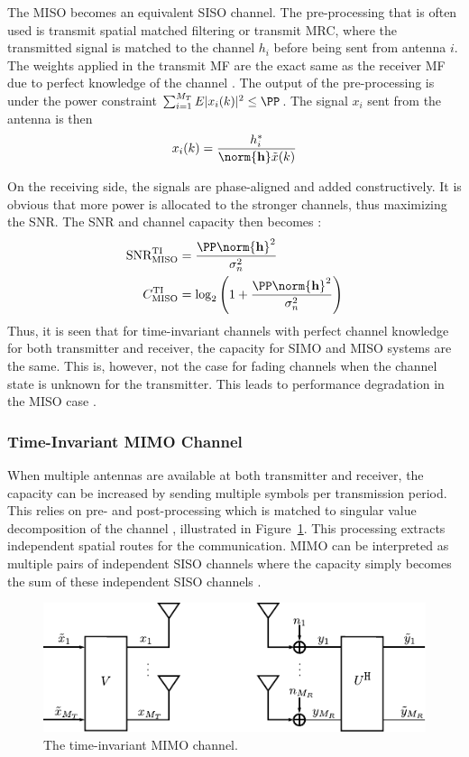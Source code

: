 The MISO becomes an equivalent SISO channel. The pre-processing that is often used is transmit spatial matched filtering or transmit MRC, where the transmitted signal is matched to the channel $h_i$ before being sent from antenna $i$. The weights applied in the transmit MF are the exact same as the receiver MF due to perfect knowledge of the channel \cite{Tim2012Practical}. The output of the pre-processing is under the power constraint $\sum_{i=1}^{M_T} E|x_i(k)|^2 \leq \PP$. The signal $x_i$ sent from the antenna is then \cite{Tim2012Practical}
\begin{align}%
  x_i(k) = \frac{h_i^*}{\norm{\mathbf{h}} \tilde{x}(k)}
\end{align}

On the receiving side, the signals are phase-aligned and added constructively. It is obvious that more power is allocated to the stronger channels, thus maximizing the SNR. The SNR and channel capacity then becomes \cite{Tim2012Practical}:
\begin{align} %
\text{SNR}^{\text{TI}}_{\text{MISO}} &= \frac{\PP \norm{\mathbf{h}}^2}{\sigma^2_n} \\
C^{\text{TI}}_{\text{MISO}} &= \log_2 \left( 1+\frac{\PP \norm{\mathbf{h}}^2}{\sigma^2_n} \right)  
\end{align}
Thus, it is seen that for time-invariant channels with perfect channel knowledge for both transmitter and receiver, the capacity for SIMO and MISO systems are the same. This is, however, not the case for fading channels when the channel state is unknown for the transmitter. This leads to performance degradation in the MISO case \cite{Tim2012Practical}. 

\subsubsection{Time-Invariant MIMO Channel}
When multiple antennas are available at both transmitter and receiver, the capacity can be increased by sending multiple symbols per transmission period. This relies on pre- and post-processing which is matched to singular value decomposition of the channel \cite{Tim2012Practical}, illustrated in Figure~\ref{fig:mimoModel}. This processing extracts independent spatial routes for the communication. MIMO can be interpreted as multiple pairs of independent SISO channels where the capacity simply becomes the sum of these independent SISO channels \cite{Tim2012Practical}.

\begin{figure}[htbp]
  \centering
  \includegraphics[scale=1.2]{img/analysis/mimoModel}
  \caption{The time-invariant MIMO channel.}
  \label{fig:mimoModel}
\end{figure}

